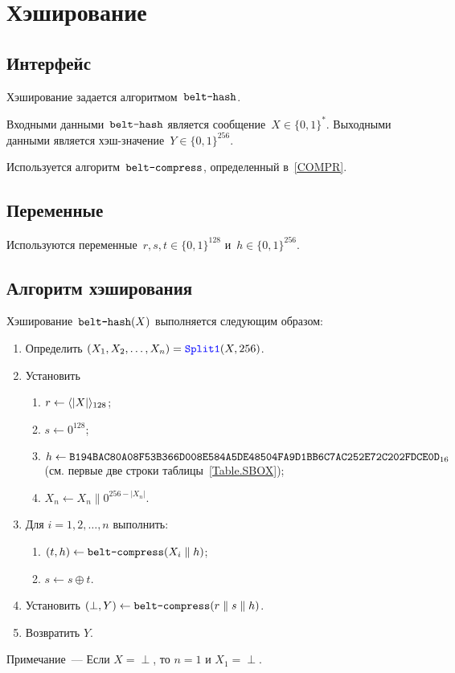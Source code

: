 \section{Хэширование}\label{HASH}

\subsection{Интерфейс}\label{HASH.IFace}

Хэширование задается алгоритмом~$\texttt{belt-hash}$.

Входными данными~$\texttt{belt-hash}$ является сообщение~$X\in\{0,1\}^*$.
%
Выходными данными является хэш-значение~$Y\in\{0,1\}^{256}$.

Используется алгоритм~$\texttt{belt-compress}$, определенный в~\ref{COMPR}.

\subsection{Переменные}\label{HASH.Vars}

Используются переменные~$r,s,t\in\{0,1\}^{128}$ и~$h\in\{0,1\}^{256}$.

\subsection{Алгоритм хэширования}\label{HASH.Alg}

Хэширование~$\texttt{belt-hash}(X)$ выполняется следующим образом:
\begin{enumerate}
\item
Определить $(X_1,X_2,\ldots,X_n)=\mathop{\textcolor{blue}{\texttt{Split1}}}\nolimits(X, 256)$.

\item
Установить
\begin{enumerate}
\item
$r\leftarrow \langle|X|\rangle_{128}$;
\item
$s\leftarrow 0^{128}$;
\item
$h\leftarrow\texttt{B194BAC80A08F53B366D008E584A5DE48504FA9D1BB6C7AC252E72C202FDCE0D}_{16}$ 
(см. первые две строки таблицы~\ref{Table.SBOX});
\item
$X_n\leftarrow X_n \parallel 0^{256-|X_n|}$.
\end{enumerate}

\item
Для $i=1,2,\ldots,n$ выполнить:
\begin{enumerate}
\item
$(t,h)\leftarrow\texttt{belt-compress}(X_i\parallel h)$;
\item
$s\leftarrow s\oplus t$.
\end{enumerate}

\item
Установить 
$(\perp,Y)\leftarrow\texttt{belt-compress}(r\parallel s\parallel h)$.

\item
Возвратить $Y$.
\end{enumerate}

\begin{note}
Примечание~--- Если $X=\perp$, то $n=1$ и $X_1=\perp$.
\end{note}
